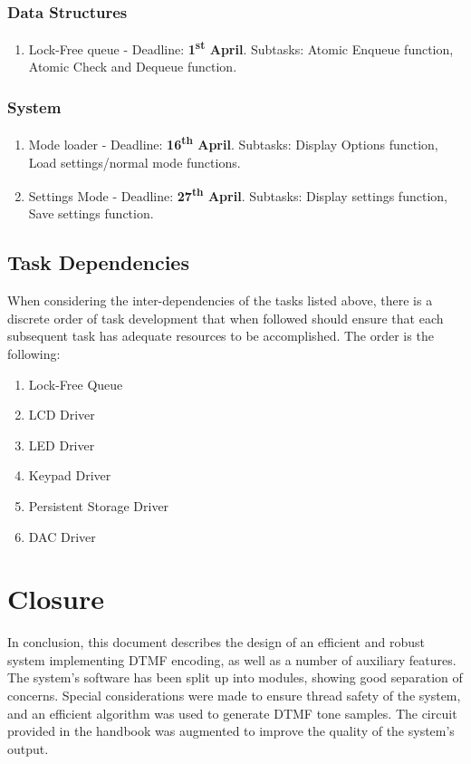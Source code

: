 \documentclass[11pt,a4paper,twocolumn]{scrartcl}
\begin{document}
\subsubsection{Data Structures}
\begin{enumerate}
    \item Lock-Free queue - Deadline: \textbf{1\textsuperscript{st} April}. Subtasks: Atomic Enqueue function, Atomic Check and Dequeue function.
\end{enumerate}

\subsubsection{System}
\begin{enumerate}
    \item Mode loader - Deadline: \textbf{16\textsuperscript{th} April}. Subtasks: Display Options function, Load settings/normal mode functions.
    \item Settings Mode - Deadline: \textbf{27\textsuperscript{th} April}. Subtasks: Display settings function, Save settings function.
\end{enumerate}

\subsection{Task Dependencies}
When considering the inter-dependencies of the tasks listed above, there is a discrete order of task development that when followed should ensure that each subsequent task has adequate resources to be accomplished. The order is the following:
\begin{enumerate}
    \item Lock-Free Queue
    \item LCD Driver
   \item LED Driver
   \item Keypad Driver
   \item Persistent Storage Driver
   \item DAC Driver
\end{enumerate}

\section{Closure}

In conclusion, this document describes the design of an efficient and robust system implementing DTMF encoding, as well as a number of auxiliary features. The system's software has been split up
into modules, showing good separation of concerns. Special considerations were made to ensure thread safety of the system, and an efficient algorithm was used to generate DTMF tone samples. The circuit provided in the handbook was augmented to improve the quality of the system's output. 



\end{document}

